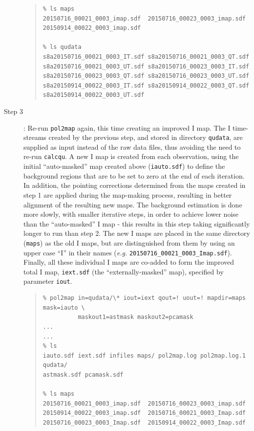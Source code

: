 \documentclass[twoside,11pt]{starlink}
\begin{document}
\begin{description}
\begin{quote}
\begin{verbatim}
% ls maps
20150716_00021_0003_imap.sdf  20150716_00023_0003_imap.sdf
20150914_00022_0003_imap.sdf

% ls qudata
s8a20150716_00021_0003_IT.sdf s8a20150716_00021_0003_QT.sdf
s8a20150716_00021_0003_UT.sdf s8a20150716_00023_0003_IT.sdf
s8a20150716_00023_0003_QT.sdf s8a20150716_00023_0003_UT.sdf
s8a20150914_00022_0003_IT.sdf s8a20150914_00022_0003_QT.sdf
s8a20150914_00022_0003_UT.sdf
\end{verbatim}
\end{quote}

\item[Step 3]:  Re-run \texttt{pol2map} again, this time creating an
improved I map. The I time-streams created by the previous step, and stored
in directory \texttt{qudata}, are supplied as input instead of the raw data
files, thus avoiding the need to re-run \texttt{calcqu}. A new I map is
created from each observation, using the initial ``auto-masked'' map created
above (\texttt{iauto.sdf}) to define the background regions that are to be set
to zero at the end of each iteration. In addition, the pointing corrections
determined from the maps created in step 1 are applied during the map-making
process, resulting in better alignment of the resulting new maps. The
background estimation is done more slowly, with smaller iterative steps,
in order to achieve lower noise than the ``auto-masked'' I map - this
results in this step taking significantly longer to run than step 2. The new
I maps are placed in the same directory (\texttt{maps}) as the old I
maps, but are distinguished from them by using an upper case ``I'' in
their names (\emph{e.g.} \texttt{20150716\_00021\_0003\_Imap.sdf}). Finally,
all these individual I maps are co-added to form the improved total I map,
\texttt{iext.sdf} (the ``externally-masked'' map), specified by parameter
\texttt{iout}.

\begin{quote}
\begin{verbatim}
% pol2map in=qudata/\* iout=iext qout=! uout=! mapdir=maps mask=iauto \
          maskout1=astmask maskout2=pcamask
...
...
% ls
iauto.sdf iext.sdf infiles maps/ pol2map.log pol2map.log.1 qudata/
astmask.sdf pcamask.sdf

% ls maps
20150716_00021_0003_imap.sdf  20150716_00023_0003_imap.sdf
20150914_00022_0003_imap.sdf  20150716_00021_0003_Imap.sdf
20150716_00023_0003_Imap.sdf  20150914_00022_0003_Imap.sdf

\end{verbatim}
\end{quote}


\end{description}
\end{document}
